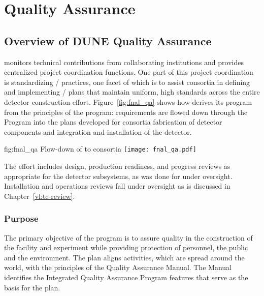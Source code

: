 \chapter{Quality Assurance}
\label{vl:tc-QA}

\section{Overview of DUNE Quality Assurance}

  monitors technical contributions from
collaborating institutions and provides centralized project
coordination functions. One part of this project coordination is
standardizing / practices, one facet
of which is to assist consortia in defining and implementing
/ plans that maintain uniform, high
standards across the entire detector construction
effort. Figure~\ref{fig:fnal_qa} shows how  
derives its  program from the principles of the \fnal {} program:
requirements are flowed down through the 
 Program into the  plans developed for consortia fabrication of
detector components and integration and installation of the detector.
\begin{dunefigure}[\fnal QA]{fig:fnal_qa}
  {Flow-down of \fnal {} to consortia}
  \texttt{[image: fnal\_qa.pdf]}
\end{dunefigure}
The  effort includes design, production readiness, and
progress reviews as appropriate for the  detector
subsystems, as was done for  under 
oversight. Installation and operations reviews fall under 
oversight as is discussed in Chapter~\ref{vl:tc-review}.

\subsection{Purpose}

The primary objective of the   program is
to assure quality in the construction of the  facility and
 experiment while providing protection of
 personnel, the public and the environment. The
 plan aligns   activities, which
are spread around the world, with the principles of the \fnal Quality
Assurance Manual. The Manual identifies the \fnal Integrated Quality
Assurance Program features that serve as the basis for the
  plan.

